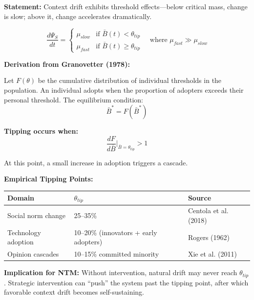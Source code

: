 \documentclass[11pt, a4paper]{article}
\begin{document}
\begin{tcolorbox}[colback=yellow!5!white, colframe=yellow!75!black,
    title=\textbf{Theorem NTM-T4: Tipping Point Dynamics (Granovetter-Schelling)}]

\textbf{Statement:} Context drift exhibits threshold effects---below critical mass, change is slow; above it, change accelerates dramatically.

\begin{equation}
\frac{d\Psi_S}{dt} = \begin{cases}
\mu_{slow} & \text{if } \bar{B}(t) < \theta_{tip} \\[0.5em]
\mu_{fast} & \text{if } \bar{B}(t) \geq \theta_{tip}
\end{cases}
\quad \text{where } \mu_{fast} \gg \mu_{slow}
\label{eq:tipping}
\end{equation}

\textbf{Derivation from Granovetter (1978):}

Let $F(\theta)$ be the cumulative distribution of individual thresholds in the population. An individual adopts when the proportion of adopters exceeds their personal threshold. The equilibrium condition:
\begin{equation}
\bar{B}^* = F(\bar{B}^*)
\end{equation}

\textbf{Tipping occurs when:}
\begin{equation}
\frac{dF}{d\bar{B}}\bigg|_{\bar{B}=\theta_{tip}} > 1
\end{equation}

At this point, a small increase in adoption triggers a cascade.

\textbf{Empirical Tipping Points:}
\begin{center}
\renewcommand{\arraystretch}{1.2}
\begin{tabular}{@{}lll@{}}
\toprule
\textbf{Domain} & \textbf{$\theta_{tip}$} & \textbf{Source} \\
\midrule
Social norm change & 25--35\% & Centola et al. (2018) \\
Technology adoption & 10--20\% (innovators + early adopters) & Rogers (1962) \\
Opinion cascades & 10--15\% committed minority & Xie et al. (2011) \\
\bottomrule
\end{tabular}
\end{center}

\textbf{Implication for NTM:} Without intervention, natural drift may never reach $\theta_{tip}$. Strategic intervention can ``push'' the system past the tipping point, after which favorable context drift becomes self-sustaining.

\end{tcolorbox}
\end{document}
